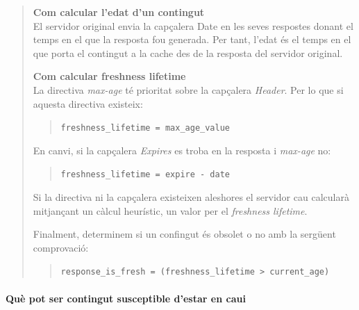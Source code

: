 \documentclass[a4paper, 11pt]{article}
\begin{document}
\begin{quote}
	
\textbf{Com calcular l'edat d'un contingut}\\ El servidor original envia la capçalera Date en les seves respostes donant el temps en el que la resposta fou generada. Per tant, l'edat \'es el temps en el que porta el contingut a la cache des de la resposta del servidor original.

\textbf{Com calcular freshness lifetime}\\ La directiva \textit{max-age} t\'e prioritat sobre la capçalera \textit{Header}. Per lo que si aquesta directiva existeix:
\begin{quote}
	\verb+freshness_lifetime = max_age_value+
\end{quote}

En canvi, si la capçalera \textit{Expires} es troba en la resposta i \textit{max-age} no:
\begin{quote}
	\verb+freshness_lifetime = expire - date+
\end{quote}

Si la directiva ni la capçalera existeixen aleshores el servidor cau calcularà mitjançant un càlcul heurístic, un valor per el \textit{freshness lifetime}.

Finalment, determinem si un confingut \'es obsolet o no amb la sergüent comprovació:
\begin{quote}
	\verb+response_is_fresh = (freshness_lifetime > current_age)+
\end{quote}

\end{quote}
\paragraph{Què pot ser contingut susceptible d'estar en caui \\}
\end{document}
